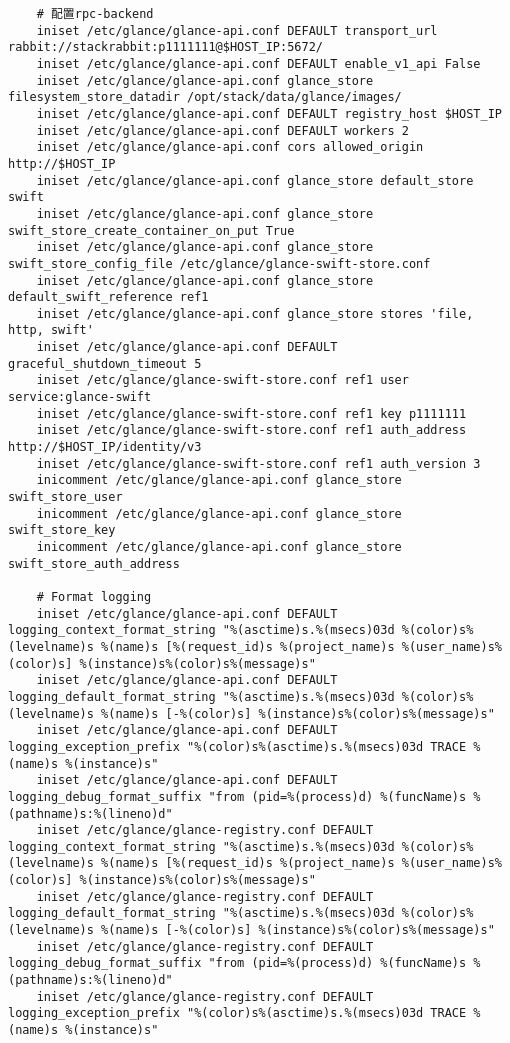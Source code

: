 \documentclass[a4paper,left=1.5cm,right=1.5cm,11pt]{article}
\begin{document}
\begin{lstlisting}
	# 配置rpc-backend
	iniset /etc/glance/glance-api.conf DEFAULT transport_url rabbit://stackrabbit:p1111111@$HOST_IP:5672/
	iniset /etc/glance/glance-api.conf DEFAULT enable_v1_api False
    iniset /etc/glance/glance-api.conf glance_store filesystem_store_datadir /opt/stack/data/glance/images/
    iniset /etc/glance/glance-api.conf DEFAULT registry_host $HOST_IP
    iniset /etc/glance/glance-api.conf DEFAULT workers 2
	iniset /etc/glance/glance-api.conf cors allowed_origin http://$HOST_IP
	iniset /etc/glance/glance-api.conf glance_store default_store swift
    iniset /etc/glance/glance-api.conf glance_store swift_store_create_container_on_put True
	iniset /etc/glance/glance-api.conf glance_store swift_store_config_file /etc/glance/glance-swift-store.conf
    iniset /etc/glance/glance-api.conf glance_store default_swift_reference ref1
    iniset /etc/glance/glance-api.conf glance_store stores 'file, http, swift'
    iniset /etc/glance/glance-api.conf DEFAULT graceful_shutdown_timeout 5
	iniset /etc/glance/glance-swift-store.conf ref1 user service:glance-swift
    iniset /etc/glance/glance-swift-store.conf ref1 key p1111111
	iniset /etc/glance/glance-swift-store.conf ref1 auth_address http://$HOST_IP/identity/v3
    iniset /etc/glance/glance-swift-store.conf ref1 auth_version 3
    inicomment /etc/glance/glance-api.conf glance_store swift_store_user
    inicomment /etc/glance/glance-api.conf glance_store swift_store_key
    inicomment /etc/glance/glance-api.conf glance_store swift_store_auth_address
	
	# Format logging
	iniset /etc/glance/glance-api.conf DEFAULT logging_context_format_string "%(asctime)s.%(msecs)03d %(color)s%(levelname)s %(name)s [%(request_id)s %(project_name)s %(user_name)s%(color)s] %(instance)s%(color)s%(message)s"
    iniset /etc/glance/glance-api.conf DEFAULT logging_default_format_string "%(asctime)s.%(msecs)03d %(color)s%(levelname)s %(name)s [-%(color)s] %(instance)s%(color)s%(message)s"
	iniset /etc/glance/glance-api.conf DEFAULT logging_exception_prefix "%(color)s%(asctime)s.%(msecs)03d TRACE %(name)s %(instance)s"
	iniset /etc/glance/glance-api.conf DEFAULT logging_debug_format_suffix "from (pid=%(process)d) %(funcName)s %(pathname)s:%(lineno)d"
	iniset /etc/glance/glance-registry.conf DEFAULT logging_context_format_string "%(asctime)s.%(msecs)03d %(color)s%(levelname)s %(name)s [%(request_id)s %(project_name)s %(user_name)s%(color)s] %(instance)s%(color)s%(message)s"
    iniset /etc/glance/glance-registry.conf DEFAULT logging_default_format_string "%(asctime)s.%(msecs)03d %(color)s%(levelname)s %(name)s [-%(color)s] %(instance)s%(color)s%(message)s"
	iniset /etc/glance/glance-registry.conf DEFAULT logging_debug_format_suffix "from (pid=%(process)d) %(funcName)s %(pathname)s:%(lineno)d"
	iniset /etc/glance/glance-registry.conf DEFAULT logging_exception_prefix "%(color)s%(asctime)s.%(msecs)03d TRACE %(name)s %(instance)s"
	

\end{lstlisting}
\end{document}
